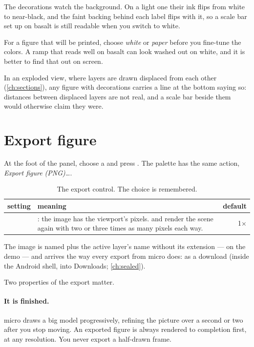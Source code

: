 The decorations watch the background. On a light one their ink flips from white to near-black, and the faint backing behind each label flips with it, so a scale bar set up on basalt is still readable when you switch to white.

\begin{tip}
For a figure that will be printed, choose \emph{white} or \emph{paper} before you fine-tune the colors. A ramp that reads well on basalt can look washed out on white, and it is better to find that out on screen.
\end{tip}

\begin{caution}
In an exploded view, where layers are drawn displaced from each other (\cref{ch:sections}), any figure with decorations carries a line at the bottom saying so: distances between displaced layers are not real, and a scale bar beside them would otherwise claim they were.
\end{caution}

\section{Export figure}\label{sec:figures-export}

At the foot of the panel, choose a  and press . The palette has the same action, \emph{Export figure (PNG)…}.

\begin{table}[htbp]\small
\begin{tabularx}{\linewidth}{@{}lMD@{}}\toprule
setting & meaning & default \\ \midrule
{} & : the image has the viewport's pixels.  and  render the scene again with two or three times as many pixels each way. & 1× \\ \bottomrule
\end{tabularx}
\caption{The export control. The choice is remembered.}\label{tab:figures-export}
\end{table}

The image is named  plus the active layer's name without its extension —  on the demo — and arrives the way every export from micro does: as a download (inside the Android shell, into Downloads; \cref{ch:sealed}).

Two properties of the export matter.

\paragraph{It is finished.} micro draws a big model progressively, refining the picture over a second or two after you stop moving. An exported figure is always rendered to completion first, at any resolution. You never export a half-drawn frame.

